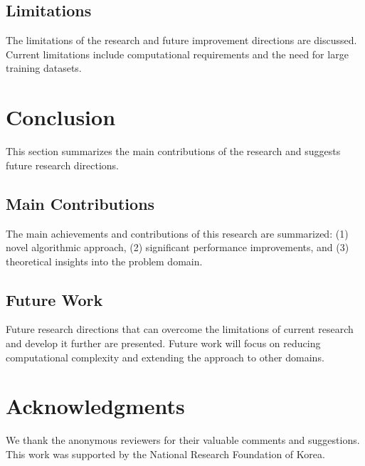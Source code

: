 \documentclass[12pt,a4paper]{article}
\begin{document}
\subsection{Limitations}
The limitations of the research and future improvement directions are discussed. Current limitations include computational requirements and the need for large training datasets.

\section{Conclusion}
\label{sec:conclusion}

This section summarizes the main contributions of the research and suggests future research directions.

\subsection{Main Contributions}
The main achievements and contributions of this research are summarized: (1) novel algorithmic approach, (2) significant performance improvements, and (3) theoretical insights into the problem domain.

\subsection{Future Work}
Future research directions that can overcome the limitations of current research and develop it further are presented. Future work will focus on reducing computational complexity and extending the approach to other domains.

\section*{Acknowledgments}
We thank the anonymous reviewers for their valuable comments and suggestions. This work was supported by the National Research Foundation of Korea.



\end{document}
